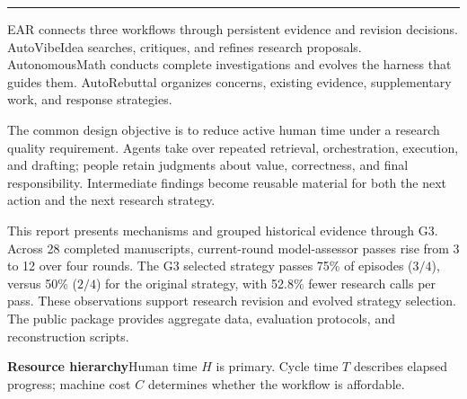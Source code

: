 \thispagestyle{cover}
\vspace*{5mm}
\par
\vspace{3mm}
\par
\vspace{3mm}
\par
\vspace{4mm}
\par
\vspace{3mm}
\ReportAuthors
\vspace{3mm}
\noindent\textcolor{teal}{\rule{\textwidth}{1.2pt}}\par
\vspace{3mm}
EAR connects three workflows through persistent evidence and revision decisions. AutoVibeIdea searches, critiques, and refines research proposals. AutonomousMath conducts complete investigations and evolves the harness that guides them. AutoRebuttal organizes concerns, existing evidence, supplementary work, and response strategies.

The common design objective is to reduce active human time under a research quality requirement. Agents take over repeated retrieval, orchestration, execution, and drafting; people retain judgments about value, correctness, and final responsibility. Intermediate findings become reusable material for both the next action and the next research strategy.

This report presents mechanisms and grouped historical evidence through G3. Across 28 completed manuscripts, current-round model-assessor passes rise from 3 to 12 over four rounds. The G3 selected strategy passes 75\% of episodes ($3/4$), versus 50\% ($2/4$) for the original strategy, with 52.8\% fewer research calls per pass. These observations support research revision and evolved strategy selection. The public package provides aggregate data, evaluation protocols, and reconstruction scripts.
\begin{insight}
\textbf{Resource hierarchy}\quad Human time $H$ is primary. Cycle time $T$ describes elapsed progress; machine cost $C$ determines whether the workflow is affordable.
\end{insight}
\vfill
{}

